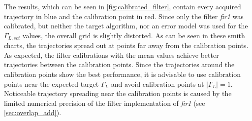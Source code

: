 \documentclass[12pt,a4paper,parskip=full,abstract=true,BCOR=12mm,twoside,open=right]{scrreprt}
\providecommand{\abs}[1]{\lvert#1\rvert}
\def\device#1{\textit{#1}}
\begin{document}
The results, which can be seen in \cref{fig:calibrated_filter}, contain every acquired
trajectory in blue and the calibration point in red. Since only the filter \device{fir1}
was calibrated, but neither the target algorithm, nor an error model was used for the
$\Gamma_{L,set}$ values, the overall grid is slightly distorted. As can be seen in these
smith charts, the trajectories spread out at points far away from the calibration points.
As expected, the filter calibrations with the mean values achieve better trajectories
between the calibration points. Since the trajectories around the calibration points
show the best performance, it is advisable to use calibration points near the expected
target $\Gamma_L$ and avoid calibration points at $\abs{\Gamma_L} = 1$. Noticeable
trajectory spreading near the calibration points is caused by the limited numerical
precision of the filter implementation of \device{fir1} (see \cref{sec:overlap_add}).
\end{document}
